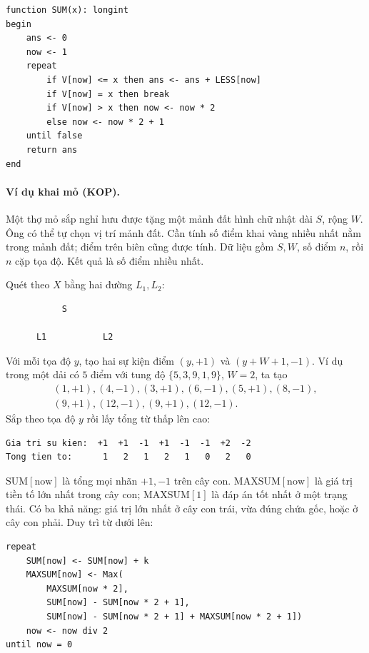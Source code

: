 \documentclass[11pt]{article}
\begin{document}
\begin{verbatim}
function SUM(x): longint
begin
    ans <- 0
    now <- 1
    repeat
        if V[now] <= x then ans <- ans + LESS[now]
        if V[now] = x then break
        if V[now] > x then now <- now * 2
        else now <- now * 2 + 1
    until false
    return ans
end
\end{verbatim}

\paragraph{Ví dụ khai mỏ (KOP).}
Một thợ mỏ sắp nghỉ hưu được tặng một mảnh đất hình chữ nhật dài \(S\), rộng
\(W\). Ông có thể tự chọn vị trí mảnh đất. Cần tính số điểm khai vàng nhiều
nhất nằm trong mảnh đất; điểm trên biên cũng được tính. Dữ liệu gồm \(S,W\),
số điểm \(n\), rồi \(n\) cặp tọa độ. Kết quả là số điểm nhiều nhất.

Quét theo \(X\) bằng hai đường \(L_1,L_2\):

\begin{verbatim}
           S

      L1           L2
\end{verbatim}

Với mỗi tọa độ \(y\), tạo hai sự kiện điểm \((y,+1)\) và \((y+W+1,-1)\). Ví
dụ trong một dải có \(5\) điểm với tung độ \(\{5,3,9,1,9\}\), \(W=2\), ta tạo
\[
\begin{gathered}
(1,+1),(4,-1),(3,+1),(6,-1),(5,+1),(8,-1),\\
(9,+1),(12,-1),(9,+1),(12,-1).
\end{gathered}
\]
Sắp theo tọa độ \(y\) rồi lấy tổng từ thấp lên cao:

\begin{verbatim}
Gia tri su kien:  +1  +1  -1  +1  -1  -1  +2  -2
Tong tien to:      1   2   1   2   1   0   2   0
\end{verbatim}

\(\mathrm{SUM[now]}\) là tổng mọi nhãn \(+1,-1\) trên cây con. \(\mathrm{MAXSUM[now]}\)
là giá trị tiền tố lớn nhất trong cây con; \(\mathrm{MAXSUM[1]}\) là đáp án
tốt nhất ở một trạng thái. Có ba khả năng: giá trị lớn nhất ở cây con trái,
vừa đúng chứa gốc, hoặc ở cây con phải. Duy trì từ dưới lên:

\begin{verbatim}
repeat
    SUM[now] <- SUM[now] + k
    MAXSUM[now] <- Max(
        MAXSUM[now * 2],
        SUM[now] - SUM[now * 2 + 1],
        SUM[now] - SUM[now * 2 + 1] + MAXSUM[now * 2 + 1])
    now <- now div 2
until now = 0
\end{verbatim}
\end{document}

